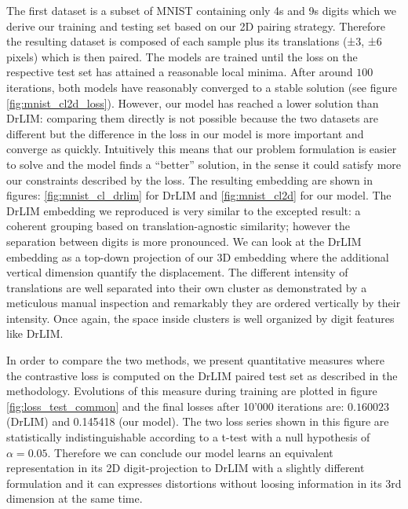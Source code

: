 \documentclass[a4paper,12pt]{report}
\begin{document}
The first dataset is a subset of MNIST containing only 4s and 9s digits which we derive our training and testing set based on our 2D pairing strategy.
Therefore the resulting dataset is composed of each sample plus its translations (±3, ±6 pixels) which is then paired.
The models are trained until the loss on the respective test set has attained a reasonable local minima.
After around $100$ iterations, both models have reasonably converged to a stable solution (see figure \ref{fig:mnist_cl2d_loss}).
However, our model has reached a lower solution than DrLIM: comparing them directly is not possible because the two datasets are different but the difference in the loss in our model is more important and converge as quickly.
Intuitively this means that our problem formulation is easier to solve and the model finds a ``better'' solution, in the sense it could satisfy more our constraints described by the loss.
The resulting embedding are shown in figures: \ref{fig:mnist_cl_drlim} for DrLIM and \ref{fig:mnist_cl2d} for our model.
The DrLIM embedding we reproduced is very similar to the excepted result: a coherent grouping based on translation-agnostic similarity; however the separation between digits is more pronounced.
We can look at the DrLIM embedding as a top-down projection of our 3D embedding where the additional vertical dimension quantify the displacement.
The different intensity of translations are well separated into their own cluster as demonstrated by a meticulous manual inspection and remarkably they are ordered vertically by their intensity.
Once again, the space inside clusters is well organized by digit features like DrLIM.

In order to compare the two methods, we present quantitative measures where the contrastive loss is computed on the DrLIM paired test set as described in the methodology.
Evolutions of this measure during training are plotted in figure \ref{fig:loss_test_common} and the final losses after 10'000 iterations are: $0.160023$ (DrLIM) and 0.145418 (our model).
The two loss series shown in this figure are statistically indistinguishable according to a t-test with a null hypothesis of $\alpha = 0.05$.
Therefore we can conclude our model learns an equivalent representation in its 2D digit-projection to DrLIM with a slightly different formulation and it can expresses distortions without loosing information in its 3rd dimension at the same time.
\end{document}
